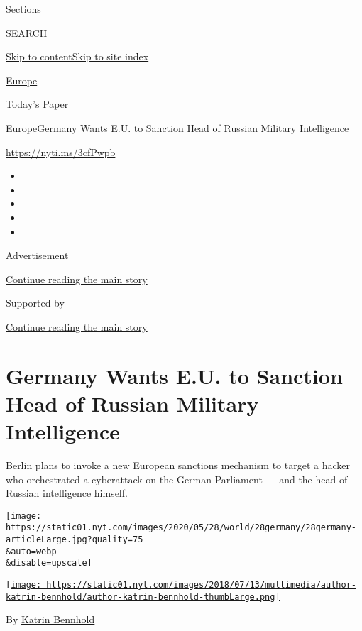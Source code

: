 Sections

SEARCH

\protect\hyperlink{site-content}{Skip to
content}\protect\hyperlink{site-index}{Skip to site index}

\href{https://www.nytimes.com/section/world/europe}{Europe}

\href{https://myaccount.nytimes.com/auth/login?response_type=cookie\&client_id=vi}{}

\href{https://www.nytimes.com/section/todayspaper}{Today's Paper}

\href{/section/world/europe}{Europe}\textbar{}Germany Wants E.U. to
Sanction Head of Russian Military Intelligence

\url{https://nyti.ms/3cfPwpb}

\begin{itemize}
\item
\item
\item
\item
\item
\end{itemize}

Advertisement

\protect\hyperlink{after-top}{Continue reading the main story}

Supported by

\protect\hyperlink{after-sponsor}{Continue reading the main story}

\hypertarget{germany-wants-eu-to-sanction-head-of-russian-military-intelligence}{%
\section{Germany Wants E.U. to Sanction Head of Russian Military
Intelligence}\label{germany-wants-eu-to-sanction-head-of-russian-military-intelligence}}

Berlin plans to invoke a new European sanctions mechanism to target a
hacker who orchestrated a cyberattack on the German Parliament --- and
the head of Russian intelligence himself.

\texttt{[image: https://static01.nyt.com/images/2020/05/28/world/28germany/28germany-articleLarge.jpg?quality=75\\\&auto=webp\\\&disable=upscale]}

\href{https://www.nytimes.com/by/katrin-bennhold}{\texttt{[image: https://static01.nyt.com/images/2018/07/13/multimedia/author-katrin-bennhold/author-katrin-bennhold-thumbLarge.png]}}

By \href{https://www.nytimes.com/by/katrin-bennhold}{Katrin Bennhold}

